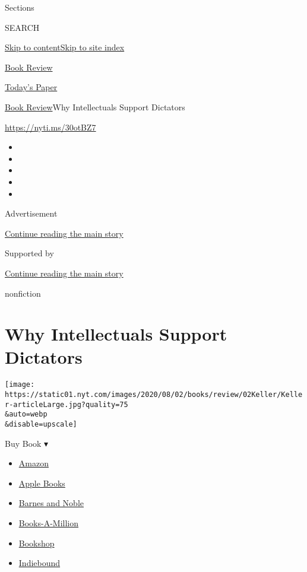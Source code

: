 Sections

SEARCH

\protect\hyperlink{site-content}{Skip to
content}\protect\hyperlink{site-index}{Skip to site index}

\href{https://www.nytimes.com/section/books/review}{Book Review}

\href{https://myaccount.nytimes.com/auth/login?response_type=cookie\&client_id=vi}{}

\href{https://www.nytimes.com/section/todayspaper}{Today's Paper}

\href{/section/books/review}{Book Review}\textbar{}Why Intellectuals
Support Dictators

\url{https://nyti.ms/30otBZ7}

\begin{itemize}
\item
\item
\item
\item
\item
\end{itemize}

Advertisement

\protect\hyperlink{after-top}{Continue reading the main story}

Supported by

\protect\hyperlink{after-sponsor}{Continue reading the main story}

nonfiction

\hypertarget{why-intellectuals-support-dictators}{%
\section{Why Intellectuals Support
Dictators}\label{why-intellectuals-support-dictators}}

\texttt{[image: https://static01.nyt.com/images/2020/08/02/books/review/02Keller/Keller-articleLarge.jpg?quality=75\\\&auto=webp\\\&disable=upscale]}

Buy Book ▾

\begin{itemize}
\tightlist
\item
  \href{https://www.amazon.com/gp/search?index=books\&tag=NYTBSREV-20\&field-keywords=Twilight+of+Democracy+Anne+Applebaum}{Amazon}
\item
  \href{https://du-gae-books-dot-nyt-du-prd.appspot.com/buy?title=Twilight+of+Democracy\&author=Anne+Applebaum}{Apple
  Books}
\item
  \href{https://www.anrdoezrs.net/click-7990613-11819508?url=https\%3A\%2F\%2Fwww.barnesandnoble.com\%2Fw\%2F\%3Fean\%3D9780385545808}{Barnes
  and Noble}
\item
  \href{https://www.anrdoezrs.net/click-7990613-35140?url=https\%3A\%2F\%2Fwww.booksamillion.com\%2Fp\%2FTwilight\%2Bof\%2BDemocracy\%2FAnne\%2BApplebaum\%2F9780385545808}{Books-A-Million}
\item
  \href{https://bookshop.org/a/3546/9780385545808}{Bookshop}
\item
  \href{https://www.indiebound.org/book/9780385545808?aff=NYT}{Indiebound}
\end{itemize}

